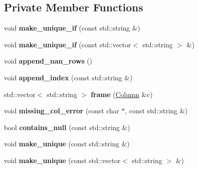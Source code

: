 \subsection*{Private Member Functions}
\begin{DoxyCompactItemize}
\item 
\mbox{\label{classDataFrame_a8454f81fa6854f280c48672214224160}} 
void {\bfseries make\+\_\+unique\+\_\+if} (const std\+::string \&)
\item 
\mbox{\label{classDataFrame_a2bb66e58b8b8153d4ae7c5e640f0fab4}} 
void {\bfseries make\+\_\+unique\+\_\+if} (const std\+::vector$<$ std\+::string $>$ \&)
\item 
\mbox{\label{classDataFrame_a8f22d43916f61216b13a36843941d1a6}} 
void {\bfseries append\+\_\+nan\+\_\+rows} ()
\item 
\mbox{\label{classDataFrame_afd67ba56aa6bbe5f0c8112953a83cf83}} 
void {\bfseries append\+\_\+index} (const std\+::string \&)
\item 
\mbox{\label{classDataFrame_aebbbb689141a2ad10a3f4d5c671a3af6}} 
std\+::vector$<$ std\+::string $>$ {\bfseries frame} (\hyperlink{classColumn}{Column} \&c)
\item 
\mbox{\label{classDataFrame_af8b8dbf9680e79fca9731dbba671ad94}} 
void {\bfseries missing\+\_\+col\+\_\+error} (const char $\ast$, const std\+::string \&)
\item 
\mbox{\label{classDataFrame_af012ea429daeef759621f73e8cbbaed2}} 
bool {\bfseries contains\+\_\+null} (const std\+::string \&)
\item 
\mbox{\label{classDataFrame_ae4262bac09b53ff891461cb9b8a26bc1}} 
void {\bfseries make\+\_\+unique} (const std\+::string \&)
\item 
\mbox{\label{classDataFrame_a428feca8859bed363d7c9b774f997551}} 
void {\bfseries make\+\_\+unique} (const std\+::vector$<$ std\+::string $>$ \&)
\item 
\mbox{\label{classDataFrame_a914f2625f0d8f09c79d45832d12a2be1}} 

\end{DoxyCompactItemize}
